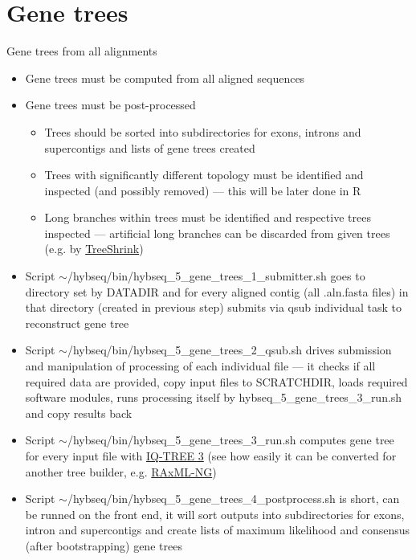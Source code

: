 \documentclass[compress,  xelatex, 11pt, xcolor=x11names, aspectratio=169,
	hyperref={
		bookmarks=true,
		unicode=true,
		colorlinks=true,
		pdftitle={HybSeq course},
		plainpages=false,
		pdfauthor={Vojtech Zeisek},
		pdfsubject={Practical processing of HybSeq target enrichment sequencing data on computing grids like MetaCentrum},
		pdfcreator={XeLaTeX},
		pdfkeywords={BASH, command line, GNU, HybSeq, Linux, MetaCentrum, sequencing shell, target enrichment},
		linkcolor=Turquoise4, %
		anchorcolor=DodgerBlue4, %
		citecolor=DodgerBlue4, %
		filecolor=DodgerBlue4, %
		menucolor=Tan4, %
		urlcolor=DarkOliveGreen4 %
		},
	url={hyphens, lowtilde} %
	]{beamer}
\renewcommand{\texttt}[1]{\colorbox{Cornsilk2}{{\ttfamily #1}}}
\begin{document}
\section{Gene trees}

\begin{frame}[allowframebreaks]{Gene trees from all alignments}
	\begin{itemize}
		\item Gene trees must be computed from all aligned sequences
		\item Gene trees must be post-processed
		\begin{itemize}
			\item Trees should be sorted into subdirectories for exons, introns and supercontigs and lists of gene trees created
			\item Trees with significantly different topology must be identified and inspected (and possibly removed) --- this will be later done in \texttt{R}
			\item Long branches within trees must be identified and respective trees inspected --- artificial long branches can be discarded from given trees (e.g. by \href{https://github.com/uym2/TreeShrink}{TreeShrink})
		\end{itemize}
		\item Script \texttt{$\sim$/hybseq/bin/hybseq\_5\_gene\_trees\_1\_submitter.sh} goes to directory set by \texttt{DATADIR} and for every aligned contig (all \texttt{*.aln.fasta} files) in that directory (created in previous step) submits via \texttt{qsub} individual task to reconstruct gene tree
		\item Script \texttt{$\sim$/hybseq/bin/hybseq\_5\_gene\_trees\_2\_qsub.sh} drives submission and manipulation of processing of each individual file --- it checks if all required data are provided, copy input files to \texttt{SCRATCHDIR}, loads required software modules, runs processing itself by \texttt{hybseq\_5\_gene\_trees\_3\_run.sh} and copy results back
		\item Script \texttt{$\sim$/hybseq/bin/hybseq\_5\_gene\_trees\_3\_run.sh} computes gene tree for every input file with \href{https://iqtree.github.io/}{IQ-TREE 3} (see how easily it can be converted for another tree builder, e.g. \href{https://github.com/amkozlov/raxml-ng}{RAxML-NG})
		\item Script \texttt{$\sim$/hybseq/bin/hybseq\_5\_gene\_trees\_4\_postprocess.sh} is short, can be runned on the front end, it will sort outputs into subdirectories for exons, intron and supercontigs and create lists of maximum likelihood and consensus (after bootstrapping) gene trees
	\end{itemize}
\end{frame}
\end{document}
